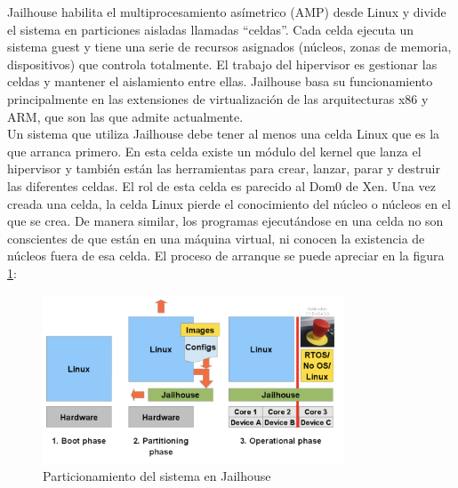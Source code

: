 Jailhouse habilita el multiprocesamiento asímetrico (\acrshort{AMP}) desde Linux y divide el sistema en particiones aisladas llamadas ``celdas''. Cada celda ejecuta un sistema guest y tiene una serie de recursos asignados (núcleos, zonas de memoria, dispositivos) que controla totalmente. El trabajo del hipervisor es gestionar las celdas y mantener el aislamiento entre ellas. Jailhouse basa su funcionamiento principalmente en las extensiones de virtualización de las arquitecturas x86 y ARM, que son las que admite actualmente.\\
Un sistema que utiliza Jailhouse debe tener al menos una celda Linux que es la que arranca primero. En esta celda existe un módulo del kernel que lanza el hipervisor y también están las herramientas para crear, lanzar, parar y destruir las diferentes celdas. El rol de esta celda es parecido al Dom0 de Xen. Una vez creada una celda, la celda Linux pierde el conocimiento del núcleo o núcleos en el que se crea. De manera similar, los programas ejecutándose en una celda no son conscientes de que están en una máquina virtual, ni conocen la existencia de núcleos fuera de esa celda. El proceso de arranque se puede apreciar en la figura \ref{fig:jail_2}:\\

\begin{figure}[h]
  \centering
  \includegraphics[width=0.80\textwidth]{recursos/jailhouse_2.png}
  \caption{Particionamiento del sistema en Jailhouse}
  \label{fig:jail_2}
\end{figure}
